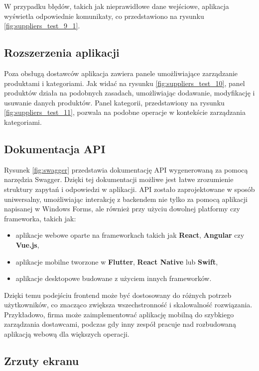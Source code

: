 W przypadku błędów, takich jak nieprawidłowe dane wejściowe, aplikacja wyświetla odpowiednie komunikaty, co przedstawiono na rysunku \ref{fig:suppliers_test_9_1}.

\subsection{Rozszerzenia aplikacji}
Poza obsługą dostawców aplikacja zawiera panele umożliwiające zarządzanie produktami i kategoriami. Jak widać na rysunku \ref{fig:suppliers_test_10}, panel produktów działa na podobnych zasadach, umożliwiając dodawanie, modyfikację i usuwanie danych produktów. Panel kategorii, przedstawiony na rysunku \ref{fig:suppliers_test_11}, pozwala na podobne operacje w kontekście zarządzania kategoriami.

\subsection{Dokumentacja API}
Rysunek \ref{fig:swagger} przedstawia dokumentację API wygenerowaną za pomocą narzędzia Swagger. Dzięki tej dokumentacji możliwe jest łatwe zrozumienie struktury zapytań i odpowiedzi w aplikacji. API zostało zaprojektowane w sposób uniwersalny, umożliwiając interakcję z backendem nie tylko za pomocą aplikacji napisanej w Windows Forms, ale również przy użyciu dowolnej platformy czy frameworka, takich jak:
\begin{itemize}
    \item aplikacje webowe oparte na frameworkach takich jak \textbf{React}, \textbf{Angular} czy \textbf{Vue.js},
    \item aplikacje mobilne tworzone w \textbf{Flutter}, \textbf{React Native} lub \textbf{Swift},
    \item aplikacje desktopowe budowane z użyciem innych frameworków.
\end{itemize}

Dzięki temu podejściu frontend może być dostosowany do różnych potrzeb użytkowników, co znacząco zwiększa wszechstronność i skalowalność rozwiązania. Przykładowo, firma może zaimplementować aplikację mobilną do szybkiego zarządzania dostawcami, podczas gdy inny zespół pracuje nad rozbudowaną aplikacją webową dla większych operacji.

\subsection{Zrzuty ekranu}

